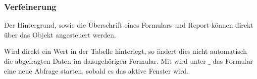 \subsubsection{Verfeinerung}
\begin{description}
	\item[Dynamische Beschriftung] Der Hintergrund, sowie die Überschrift eines Formulars und Report können direkt über das  Objekt angesteuert werden. 
	\item[Aktualisierung des Formulars] Wird direkt ein Wert in der Tabelle hinterlegt, so ändert dies nicht automatisch die abgefragten Daten im dazugehörigen Formular. Mit  wird unter $\_$ das Formular eine neue Abfrage starten, sobald es das aktive Fenster wird.
	\item 
\end{description}